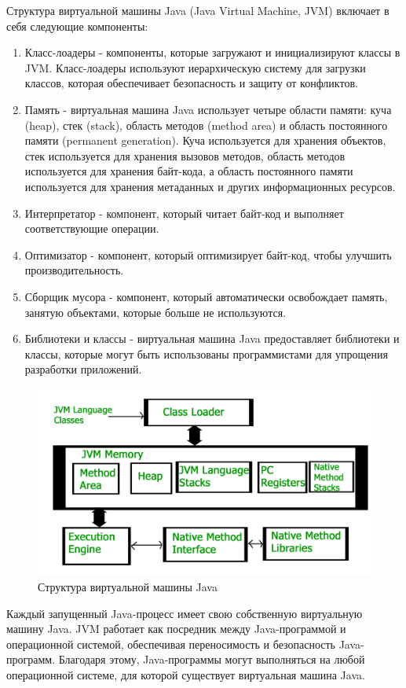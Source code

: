 Структура виртуальной машины Java (Java Virtual Machine, JVM) включает в себя следующие компоненты:
\begin{enumerate}
\item Класс-лоадеры - компоненты, которые загружают и инициализируют классы в JVM. Класс-лоадеры используют иерархическую систему для загрузки классов, которая обеспечивает безопасность и защиту от конфликтов.
\item Память - виртуальная машина Java использует четыре области памяти: куча (heap), стек (stack), область методов (method area) и область постоянного памяти (permanent generation). Куча используется для хранения объектов, стек используется для хранения вызовов методов, область методов используется для хранения байт-кода, а область постоянного памяти используется для хранения метаданных и других информационных ресурсов.
\item Интерпретатор - компонент, который читает байт-код и выполняет соответствующие операции.
\item Оптимизатор - компонент, который оптимизирует байт-код, чтобы улучшить производительность.
\item Сборщик мусора - компонент, который автоматически освобождает память, занятую объектами, которые больше не используются.
\item Библиотеки и классы - виртуальная машина Java предоставляет библиотеки и классы, которые могут быть использованы программистами для упрощения разработки приложений.
\end{enumerate}

\begin{figure}[h!]\center
  \includegraphics[width=0.8\linewidth]{images/pic1-1.jpg}
   \caption{Структура виртуальной машины Java}\label{ris1}
\end{figure}

Каждый запущенный Java-процесс имеет свою собственную виртуальную машину Java. JVM работает как посредник между Java-программой и операционной системой, обеспечивая переносимость и безопасность Java-программ. Благодаря этому, Java-программы могут выполняться на любой операционной системе, для которой существует виртуальная машина Java.

